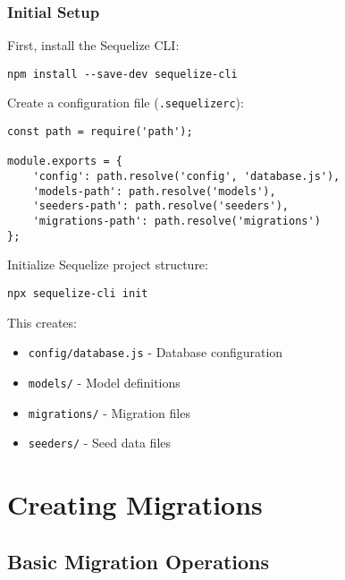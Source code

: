 \documentclass[12pt,a4paper]{book}
\begin{document}
	\subsubsection{Initial Setup}
	\begin{tcolorbox}[title=Migration Configuration]
		First, install the Sequelize CLI:
		
		\begin{verbatim}
npm install --save-dev sequelize-cli
		\end{verbatim}
		
		Create a configuration file (\texttt{.sequelizerc}):
		
		\begin{verbatim}
const path = require('path');

module.exports = {
	'config': path.resolve('config', 'database.js'),
	'models-path': path.resolve('models'),
	'seeders-path': path.resolve('seeders'),
	'migrations-path': path.resolve('migrations')
};
		\end{verbatim}
		
		Initialize Sequelize project structure:
		
		\begin{verbatim}
npx sequelize-cli init
		\end{verbatim}
		
		This creates:
		\begin{itemize}
			\item \texttt{config/database.js} - Database configuration
			\item \texttt{models/} - Model definitions
			\item \texttt{migrations/} - Migration files
			\item \texttt{seeders/} - Seed data files
		\end{itemize}
	\end{tcolorbox}
	
	\section{Creating Migrations}
	
	\subsection{Basic Migration Operations}
	
\end{document}
